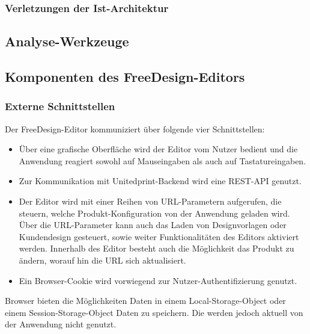 \subsubsection{Verletzungen der Ist-Architektur }

	
\subsection{Analyse-Werkzeuge}


\subsection{Komponenten des FreeDesign-Editors}

\subsubsection{Externe Schnittstellen}
Der FreeDesign-Editor kommuniziert über folgende vier Schnittstellen:
\begin{itemize}
	\item Über eine grafische Oberfläche wird der Editor vom Nutzer bedient und die Anwendung reagiert sowohl auf Mauseingaben als auch auf Tastatureingaben. 
	\item Zur Kommunikation mit Unitedprint-Backend wird eine REST-API genutzt. 
	\item Der Editor wird mit einer Reihen von URL-Parametern aufgerufen, die steuern, welche Produkt-Konfiguration von der Anwendung geladen wird. Über die URL-Parameter kann auch das Laden von Designvorlagen oder Kundendesign gesteuert, sowie weiter Funktionalitäten des Editors aktiviert werden. 
	Innerhalb des Editor besteht auch die Möglichkeit das Produkt zu ändern, worauf hin die URL sich aktualisiert.
	\item Ein Browser-Cookie wird vorwiegend zur Nutzer-Authentifizierung genutzt. 
\end{itemize}

Browser bieten die Möglichkeiten Daten in einem Local-Storage-Object oder einem Session-Storage-Object Daten zu speichern. \cite{Mozilla:Storage}
Die werden jedoch aktuell von der Anwendung nicht genutzt. 


